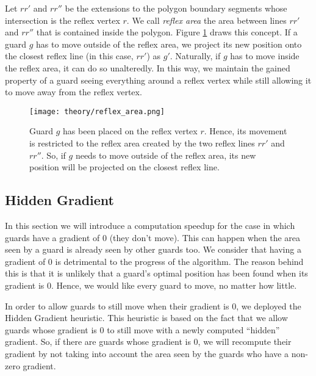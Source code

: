 Let $rr'$ and $rr''$ be the extensions to the polygon boundary segments whose intersection is the reflex vertex $r$. We call \textit{reflex area} the area between lines $rr'$ and $rr''$ that is contained inside the polygon. Figure \ref{fig:reflex_area} draws this concept. If a guard $g$ has to move outside of the reflex area, we project its new position onto the closest reflex line (in this case, $rr'$) as $g'$. Naturally, if $g$ has to move inside the reflex area, it can do so unalteredly. In this way, we maintain the gained property of a guard seeing everything around a reflex vertex while still allowing it to move away from the reflex vertex.

\begin{figure}[h!]
    \centering
    \texttt{[image: theory/reflex\_area.png]}
    \caption{Guard $g$ has been placed on the reflex vertex $r$. Hence, its movement is restricted to the reflex area created by the two reflex lines $rr'$ and $rr''$. So, if $g$ needs to move outside of the reflex area, its new position will be projected on the closest reflex line.}
    \label{fig:reflex_area}
\end{figure}


\subsection{Hidden Gradient}
In this section we will introduce a computation speedup for the case in which guards have a gradient of 0 (they don't move). This can happen when the area seen by a guard is already seen by other guards too. We consider that having a gradient of 0 is detrimental to the progress of the algorithm. The reason behind this is that it is unlikely that a guard's optimal position has been found when its gradient is 0. Hence, we would like every guard to move, no matter how little.

In order to allow guards to still move when their gradient is 0, we deployed the Hidden Gradient heuristic. This heuristic is based on the fact that we allow guards whose gradient is 0 to still move with a newly computed ``hidden'' gradient. So, if there are guards whose gradient is 0, we will recompute their gradient by not taking into account the area seen by the guards who have a non-zero gradient.

